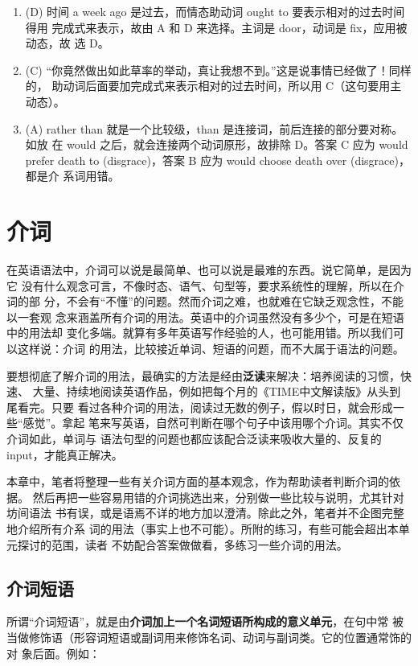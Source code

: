 \begin{enumerate}
\item (D) 时间 a week ago 是过去，而情态助动词 ought to 要表示相对的过去时间得用
  完成式来表示，故由 A 和 D 来选择。主词是 door，动词是 fix，应用被动态，故
  选 D。

\item (C) “你竟然做出如此草率的举动，真让我想不到。”这是说事情已经做了！同样的，
  助动词后面要加完成式来表示相对的过去时间，所以用 C（这句要用主动态）。
\item (A) rather than 就是一个比较级，than 是连接词，前后连接的部分要对称。如放
  在 would 之后，就会连接两个动词原形，故排除 D。答案 C 应为 would prefer
  death to (disgrace)，答案 B 应为 would choose death over (disgrace)，都是介
  系词用错。

\end{enumerate}

\chapter{介词}

在英语语法中，介词可以说是最简单、也可以说是最难的东西。说它简单，是因为它
没有什么观念可言，不像时态、语气、句型等，要求系统性的理解，所以在介词的部
分，不会有“不懂”的问题。然而介词之难，也就难在它缺乏观念性，不能以一套观
念来涵盖所有介词的用法。英语中的介词虽然没有多少个，可是在短语中的用法却
变化多端。就算有多年英语写作经验的人，也可能用错。所以我们可以这样说：介词
的用法，比较接近单词、短语的问题，而不大属于语法的问题。

要想彻底了解介词的用法，最确实的方法是经由\textbf{泛读}来解决：培养阅读的习惯，快速、
大量、持续地阅读英语作品，例如把每个月的《TIME中文解读版》从头到尾看完。只要
看过各种介词的用法，阅读过无数的例子，假以时日，就会形成一些“感觉”。拿起
笔来写英语，自然可判断在哪个句子中该用哪个介词。其实不仅介词如此，单词与
语法句型的问题也都应该配合泛读来吸收大量的、反复的input，才能真正解决。

本章中，笔者将整理一些有关介词方面的基本观念，作为帮助读者判断介词的依据。
然后再把一些容易用错的介词挑选出来，分别做一些比较与说明，尤其针对坊间语法
书有误，或是语焉不详的地方加以澄清。除此之外，笔者并不企图完整地介绍所有介系
词的用法（事实上也不可能）。所附的练习，有些可能会超出本单元探讨的范围，读者
不妨配合答案做做看，多练习一些介词的用法。

\section{介词短语}

所谓“介词短语”，就是由\textbf{介词加上一个名词短语所构成的意义单元}，在句中常
被当做修饰语（形容词短语或副词用来修饰名词、动词与副词类。它的位置通常饰的对
象后面。例如：

